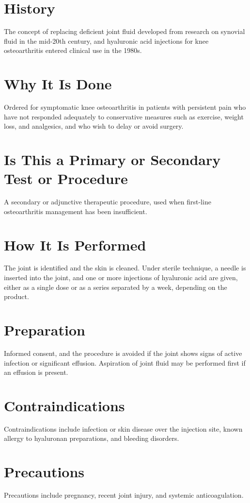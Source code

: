 \section*{History}
The concept of replacing deficient joint fluid developed from research on synovial fluid in the mid-20th century, and hyaluronic acid injections for knee osteoarthritis entered clinical use in the 1980s.
\section*{Why It Is Done}
Ordered for symptomatic knee osteoarthritis in patients with persistent pain who have not responded adequately to conservative measures such as exercise, weight loss, and analgesics, and who wish to delay or avoid surgery.
\section*{Is This a Primary or Secondary Test or Procedure}
A secondary or adjunctive therapeutic procedure, used when first-line osteoarthritis management has been insufficient.
\section*{How It Is Performed}
The joint is identified and the skin is cleaned. Under sterile technique, a needle is inserted into the joint, and one or more injections of hyaluronic acid are given, either as a single dose or as a series separated by a week, depending on the product.
\section*{Preparation}
Informed consent, and the procedure is avoided if the joint shows signs of active infection or significant effusion. Aspiration of joint fluid may be performed first if an effusion is present.
\section*{Contraindications}
Contraindications include infection or skin disease over the injection site, known allergy to hyaluronan preparations, and bleeding disorders.

\section*{Precautions}
Precautions include pregnancy, recent joint injury, and systemic anticoagulation.

